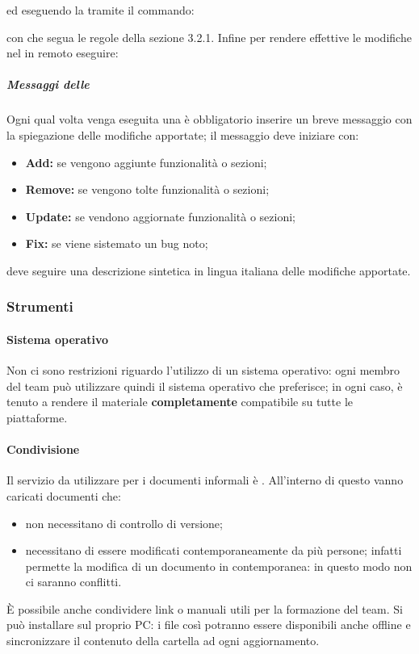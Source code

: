 		\begin{center}
		\end{center}
		ed eseguendo la  tramite il commando:
		\begin{center}
		\end{center}
		con  che segua le regole della sezione 3.2.1.
		Infine per rendere effettive le modifiche nel  in remoto eseguire:
		\begin{center}
		\end{center}
		\subparagraph{Messaggi delle }
		Ogni qual volta venga eseguita una  è obbligatorio inserire un breve messaggio con la spiegazione
		delle modifiche apportate; il messaggio deve iniziare con:
		\begin{itemize}
			\item \textbf{Add:} se vengono aggiunte funzionalità o sezioni;
			\item \textbf{Remove:} se vengono tolte funzionalità o sezioni;
			\item \textbf{Update:} se vendono aggiornate funzionalità o sezioni;
			\item \textbf{Fix:} se viene sistemato un bug noto;
		\end{itemize}
		deve seguire una descrizione sintetica in lingua italiana delle modifiche apportate.
\subsubsection{Strumenti}
	\paragraph{Sistema operativo}
	Non ci sono restrizioni riguardo l'utilizzo di un sistema operativo: ogni membro del team può utilizzare quindi il sistema operativo che preferisce; in ogni caso, è tenuto a rendere il materiale  \textbf{completamente} compatibile su tutte le piattaforme.
	\paragraph{Condivisione}
	Il servizio da utilizzare per i documenti informali è .
	All'interno di questo  vanno caricati documenti che:
	\begin{itemize}
		\item non necessitano di controllo di versione;
		\item necessitano di essere modificati contemporaneamente da più persone; infatti  permette la modifica di un documento in contemporanea: in questo modo non ci saranno conflitti.
	\end{itemize}
	È possibile anche condividere link o manuali utili per la formazione del team. Si può installare  sul proprio PC: i file così potranno essere disponibili anche offline e sincronizzare il contenuto della cartella ad ogni aggiornamento.
